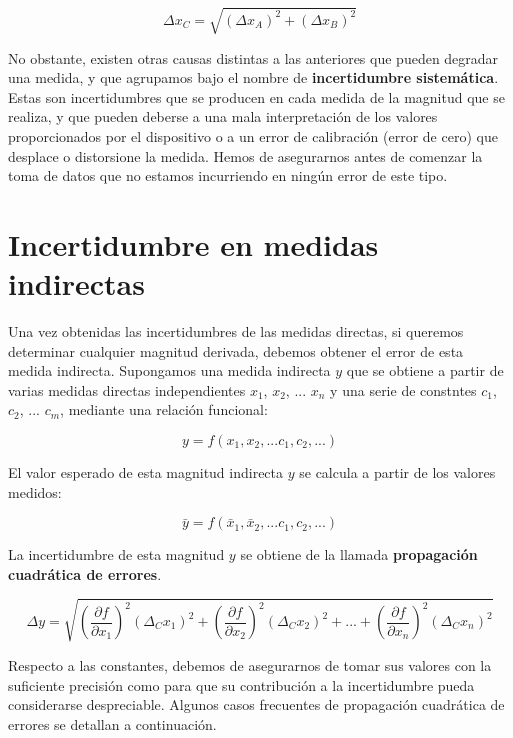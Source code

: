 \documentclass{book}
\begin{document}
\begin{equation}
  \Delta x_C = \sqrt{(\Delta x_A)^2 + (\Delta x_B)^2}
\end{equation}

No obstante, existen otras causas distintas a las anteriores que pueden degradar una medida, y
que agrupamos bajo el nombre de \textbf{incertidumbre sistemática}. Estas son incertidumbres que se producen
en cada medida de la magnitud que se realiza, y que pueden deberse a una mala interpretación de
los valores proporcionados por el dispositivo o a un error de calibración (error de cero) que
desplace o distorsione la medida. Hemos de asegurarnos antes de comenzar la toma de datos que no
estamos incurriendo en ningún error de este tipo.

\section{Incertidumbre en medidas indirectas}

Una vez obtenidas las incertidumbres de las medidas directas, si queremos determinar cualquier
magnitud derivada, debemos obtener el error de esta medida indirecta. Supongamos una medida
indirecta $y$ que se obtiene a partir de varias medidas directas independientes $x_1$, $x_2$, 
... $x_n$  y una serie de constntes $c_1$, $c_2$, ... $c_m$, mediante una relación funcional:

\begin{equation}
  y = f(x_1, x_2, ... c_1, c_2, ...)
\end{equation}

El valor esperado de esta magnitud indirecta $y$ se calcula a partir de los valores medidos:

\begin{equation}
  \bar{y} = f(\bar{x}_1, \bar{x}_2, ... c_1, c_2, ...)
\end{equation}

La incertidumbre de esta magnitud $y$ se obtiene de la llamada \textbf{propagación cuadrática de 
errores}.

\begin{equation}
  \Delta y = \sqrt{ \left( \frac{\partial f}{\partial x_1} \right)^2 (\Delta_C x_1)^2 + 
  \left( \frac{\partial f}{\partial x_2} \right)^2 (\Delta_C x_2)^2 + ... +
  \left( \frac{\partial f}{\partial x_n} \right)^2 (\Delta_C x_n)^2}
\end{equation}

Respecto a las constantes, debemos de asegurarnos de tomar sus valores con la suficiente precisión
como para que su contribución a la incertidumbre pueda considerarse despreciable. Algunos casos
frecuentes de propagación cuadrática de errores se detallan a continuación.
\end{document}

